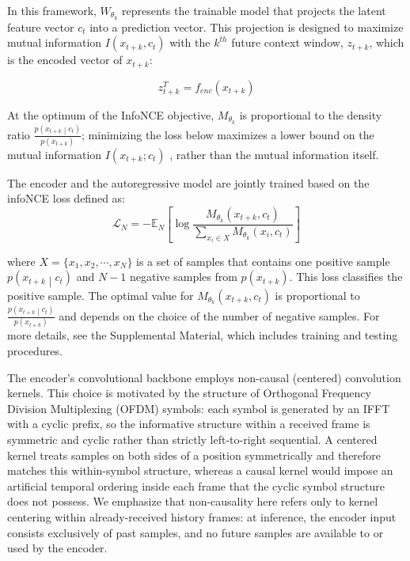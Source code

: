 \documentclass[lettersize,journal]{IEEEtran}
\begin{document}
In this framework, $W_{\theta_k}$ represents the trainable model that projects the latent feature vector $c_t$ into a prediction vector. This projection is designed to maximize mutual information $I\left(x_{t+k},c_t\right)$ with the $k^{th}$ future context window, $z_{t+k}$, which is the encoded vector of $x_{t+k}$: 

\begin{equation}
    z_{t+k}^T=f_{enc}\left(x_{t+k}\right)
\end{equation}

At the optimum of the InfoNCE objective, $M_{\theta_k}$ is proportional to the density ratio $\frac{p\left(x_{t+k}\middle| c_t\right)}{p\left(x_{t+k}\right)}$; minimizing the loss below maximizes a lower bound on the mutual information $I\left(x_{t+k};c_t\right)$ \cite{model_ref1}, rather than the mutual information itself.

The encoder and the autoregressive model are jointly trained based on the infoNCE loss \cite{model_ref1} defined as:
\begin{equation*}
    \mathcal{L}_N = -\mathbb{E}_N\left[\log\frac{M_{\theta_k}(x_{t+k}, c_t)}{\sum_{x_i\in X}M_{\theta_k}(x_i, c_t)}\right]
\end{equation*}

where $X=\{x_1,x_2,\cdots,x_N\}$ is a set of samples that contains one positive sample $p\left(x_{t+k}\middle| c_t\right)$ and $N-1$ negative samples from $p\left(x_{t+k}\right)$. This loss classifies the positive sample. The optimal value for $M_{\theta_k}\left(x_{t+k},c_t\right)$ is proportional to $\frac{p\left(x_{t+k}\middle| c_t\right)}{p\left(x_{t+k}\right)}$ and depends on the choice of the number of negative samples. For more details, see the Supplemental Material, which includes training and testing procedures.

The encoder's convolutional backbone employs non-causal (centered) convolution kernels. This choice is motivated by the structure of Orthogonal Frequency Division Multiplexing (OFDM) symbols: each symbol is generated by an IFFT with a cyclic prefix, so the informative structure within a received frame is symmetric and cyclic rather than strictly left-to-right sequential. A centered kernel treats samples on both sides of a position symmetrically and therefore matches this within-symbol structure, whereas a causal kernel would impose an artificial temporal ordering inside each frame that the cyclic symbol structure does not possess. We emphasize that non-causality here refers only to kernel centering within already-received history frames: at inference, the encoder input consists exclusively of past samples, and no future samples are available to or used by the encoder.
\end{document}
